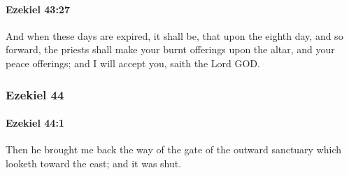 		\paragraph{Ezekiel 43:27} %
			\label{EZEKIEL-43-27}

			And when these days are expired, it shall be, that upon the eighth day, and so forward, the priests shall make your burnt offerings upon the altar, and your peace offerings; and I will accept you, saith the Lord GOD.

	\subsubsection{Ezekiel 44} %
		\label{EZEKIEL-44}

		\paragraph{Ezekiel 44:1} %
			\label{EZEKIEL-44-1}

			Then he brought me back the way of the gate of the outward sanctuary which looketh toward the east; and it was shut.

